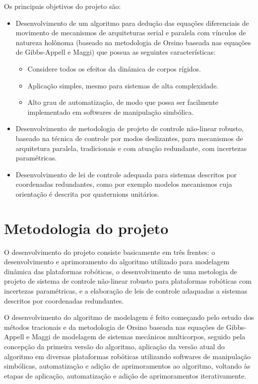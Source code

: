 \documentclass[a4paper,11pt,brazil,fleqn]{article}
\begin{document}
Os principais objetivos do projeto s\~ao:
\begin{itemize}
\item Desenvolvimento de um algoritmo para dedu\c{c}\~ao das equa\c{c}\~oes diferenciais de movimento de mecanismos de arquiteturas serial e paralela com v\'inculos de natureza hol\^onoma (baseado na metodologia de Orsino baseada nas equa\c{c}\~oes de Gibbs-Appell e Maggi) que possua as seguintes caracter\'isticas:
\begin{itemize}
\item Considere todos os efeitos da din\^amica de corpos r\'igidos.
\item Aplica\c{c}\~ao simples, mesmo para sistemas de alta complexidade.
\item Alto grau de automatiza\c{c}\~ao, de modo que possa ser facilmente implementado em softwares de manipula\c{c}\~ao simb\'olica.
\end{itemize}
\item Desenvolvimento de metodologia de projeto de controle n\~ao-linear robusto, baseado na t\'ecnica de controle por modos deslizantes, para mecanismos de arquitetura paralela, tradicionais e com atua\c{c}\~ao redundante, com incertezas param\'etricas.
\item Desenvolvimento de lei de controle adequada para sistemas descritos por coordenadas redundantes, como por exemplo modelos mecanismos cuja orienta\c{c}\~ao \'e descrita por quaternions unit\'arios.
\end{itemize}

 

\section{Metodologia do projeto}\label{S03}

O desenvolvimento do projeto consiste basicamente em tr\^es frentes: o desenvolvimento e aprimoramento do algoritmo utilizado para modelagem din\^amica das plataformas rob\'oticas, o desenvolvimento de uma metologia de projeto de sistema de controle n\~ao-linear robusto para plataformas rob\'oticas com incertezas param\'etricas, e a elabora\c{c}\~ao de leis de controle adaquadas a sistemas descritos por coordenadas redundantes.

O desenvolvimento do algoritmo de modelagem \'e feito come\c{c}ando pelo estudo dos m\'etodos tracionais e da metodologia de Orsino baseada nas equa\c{c}\~oes de Gibbs-Appell e Maggi de modelagem de sistemas mec\^anicos multicorpos, seguido pela concep\c{c}\~ao da primeira vers\~ao do algoritmo, aplica\c{c}\~ao da vers\~ao atual do algoritmo em diversas plataformas rob\'oticas utilizando softwares de manipula\c{c}\~ao simb\'olicas, automatiza\c{c}\~ao e adi\c{c}\~ao de aprimoramentos ao algoritmo, voltando \`as etapas de aplica\c{c}\~ao, automatiza\c{c}\~ao e adi\c{c}\~ao de aprimoramentos iterativamente.
\end{document}
